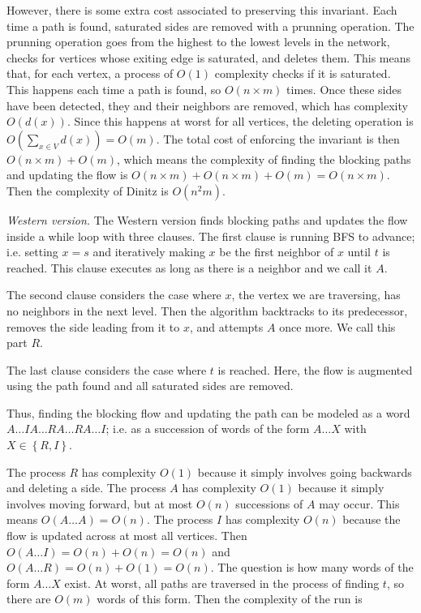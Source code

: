 \documentclass[a4paper]{article}
\begin{document}
However, there is some extra cost associated to preserving this invariant. Each
time a path is found, saturated sides are removed with a prunning operation.
The prunning operation goes from the highest to the lowest levels in the
network, checks for vertices whose exiting edge is saturated, and deletes them.
This means that, for each vertex, a process of $O(1)$ complexity checks if it
is saturated. This happens each time a path is found, so $O(n \times m)$ times.
Once these sides have been detected, they and their neighbors are removed,
which has complexity $O(d(x))$. Since this happens at worst for all vertices,
the deleting operation is $O\left( \sum_{x \in V} d(x) \right) = O(m)$. The
total cost of enforcing the invariant is then $O(n \times m) + O(m)$, which
means the complexity of finding the blocking paths and updating the flow is
$O(n \times m) + O(n \times m) + O(m) = O(n \times m) $. Then the complexity of
Dinitz is $O(n^2m)$.

\textit{Western version.} The Western version finds blocking paths and updates 
the flow inside a while loop with three clauses. The first clause is 
running BFS to advance; i.e. setting $x = s$ and iteratively making 
$x$ be the first neighbor of $x$ until $t$ is reached. This clause executes 
as long as there is a neighbor and we call it $A$.

The second clause considers the case where $x$, the vertex we are 
traversing, has no neighbors in the next level. Then the algorithm
backtracks to its predecessor, removes the side leading from it to $x$,
and attempts $A$ once more. We call this part $R$.

The last clause considers the case where $t$ is reached. Here, 
the flow is augmented using the path found and all saturated 
sides are removed.

Thus, finding the blocking flow and updating the path can be modeled 
as a word $A \ldots I A \ldots R A \ldots R A\ldots I$; i.e. as a succession 
of words of the form $A \ldots X$ with $X \in \left\{ R, I \right\} $.

The process $R$ has complexity $O(1)$ because it simply involves going
backwards and deleting a side. The process $A$ has complexity $O(1)$ because it
simply involves moving forward, but at most $O(n)$ successions of $A$ may 
occur. This means $O(A \ldots A) = O(n)$. The process $I$ has complexity $O(n)$
because the flow is updated across at most all vertices. Then  
$O(A\ldots I) = O(n) + O(n) = O(n)$ and $O(A\ldots R) = O(n) + O(1) = O(n)$.
The question is how many words of the form $A \ldots X$ exist. At worst, all
paths are traversed in the process of finding $t$, so there are $O(m)$ words of
this form. Then the complexity of the run is 
\end{document}

